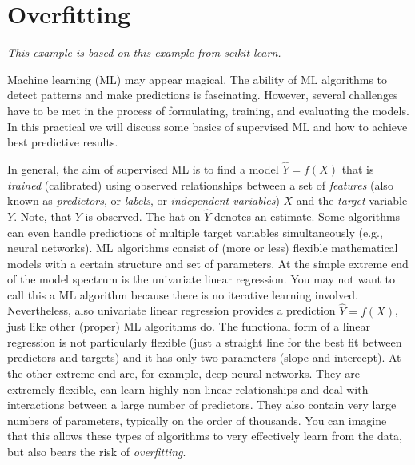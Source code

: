 \documentclass[
]{book}
\begin{document}
\hypertarget{overfitting}{%
\section{Overfitting}\label{overfitting}}

\emph{This example is based on \href{https://scikit-learn.org/stable/auto_examples/model_selection/plot_underfitting_overfitting.html}{this example from scikit-learn}.}

Machine learning (ML) may appear magical. The ability of ML algorithms to detect patterns and make predictions is fascinating. However, several challenges have to be met in the process of formulating, training, and evaluating the models. In this practical we will discuss some basics of supervised ML and how to achieve best predictive results.

In general, the aim of supervised ML is to find a model \(\hat{Y} = f(X)\) that is \emph{trained} (calibrated) using observed relationships between a set of \emph{features} (also known as \emph{predictors}, or \emph{labels}, or \emph{independent variables}) \(X\) and the \emph{target} variable \(Y\). Note, that \(Y\) is observed. The hat on \(\hat{Y}\) denotes an estimate. Some algorithms can even handle predictions of multiple target variables simultaneously (e.g., neural networks). ML algorithms consist of (more or less) flexible mathematical models with a certain structure and set of parameters. At the simple extreme end of the model spectrum is the univariate linear regression. You may not want to call this a ML algorithm because there is no iterative learning involved. Nevertheless, also univariate linear regression provides a prediction \(\hat{Y} = f(X)\), just like other (proper) ML algorithms do. The functional form of a linear regression is not particularly flexible (just a straight line for the best fit between predictors and targets) and it has only two parameters (slope and intercept). At the other extreme end are, for example, deep neural networks. They are extremely flexible, can learn highly non-linear relationships and deal with interactions between a large number of predictors. They also contain very large numbers of parameters, typically on the order of thousands. You can imagine that this allows these types of algorithms to very effectively learn from the data, but also bears the risk of \emph{overfitting}.
\end{document}
